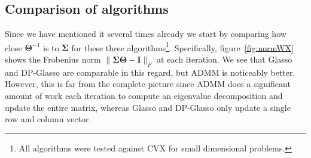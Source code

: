 \documentclass[10pt, letterpaper]{article}
\newcommand{\cov}{\boldsymbol \Sigma}
\newcommand{\preci}{\boldsymbol \Theta}
\newcommand{\tr}[1]{\mathrm{tr}\left[  #1 \right]}
\newcommand{\sampcov}{\boldsymbol S} %
\newcommand{\dualvar}{\boldsymbol Y} %
\newcommand{\eye}{\boldsymbol I} %
\newcommand{\bZ}{\boldsymbol Z} %
\begin{document}




\subsection{Comparison of algorithms}

Since we have mentioned it several times already we start by comparing how close $\preci^{-1}$ is to $\cov$ for these three algorithms\footnote{All algorithms were tested against CVX for small dimensional problems.}.  Specifically, figure~\ref{fig:normWX} shows the Frobenius norm $\|\cov\preci - \eye\|_F$ at each iteration.  We see that Glasso and DP-Glasso are comparable in this regard, but ADMM is noticeably better.  However, this is far from the complete picture since ADMM does a significant amount of work each iteration to compute an eigenvalue decomposition and update the entire matrix, whereas Glasso and DP-Glasso only update a single row and column vector.\\
\end{document}
